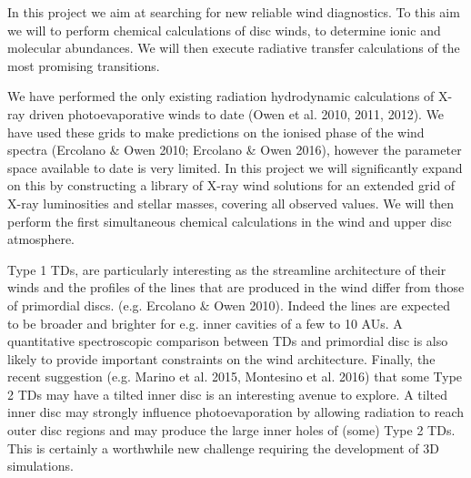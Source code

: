 In this project we aim at searching for new reliable wind diagnostics.
To this
aim we will to perform chemical calculations of disc winds, 
to determine ionic and molecular abundances. We will then execute
radiative transfer calculations of the most promising
transitions.  

We have performed the only existing radiation hydrodynamic
calculations of X-ray driven photoevaporative winds to date (Owen et
al. 2010, 2011, 2012). We have used these grids to make predictions on
the ionised phase of the wind spectra (Ercolano \& Owen 2010;
Ercolano \& Owen 2016), however the parameter space
available to date is very limited. In this project we will
significantly expand on this by constructing a
library of X-ray wind solutions for an extended grid of
X-ray luminosities and stellar masses, covering all observed
values. 
We will then 
perform the first simultaneous chemical calculations in
the wind and upper disc atmosphere.  

Type 1 TDs, are particularly interesting as the streamline architecture of their winds
and the profiles of the lines that are produced in the wind
differ from those of primordial discs. (e.g. Ercolano \& Owen
2010). Indeed the lines are expected to be broader and brighter for
e.g. inner cavities of a few to 10 AUs. A quantitative
spectroscopic comparison between TDs and primordial disc is also
likely to provide important constraints on the wind architecture. 
Finally, the recent suggestion (e.g. Marino et al. 2015, Montesino et al. 2016) that some Type 2 TDs may have a tilted inner disc is an interesting avenue to explore. A tilted inner disc may strongly influence photoevaporation by allowing radiation to reach outer disc regions and may produce the large inner holes of (some) Type 2 TDs. This is certainly a worthwhile new challenge requiring the development of 3D simulations.  

